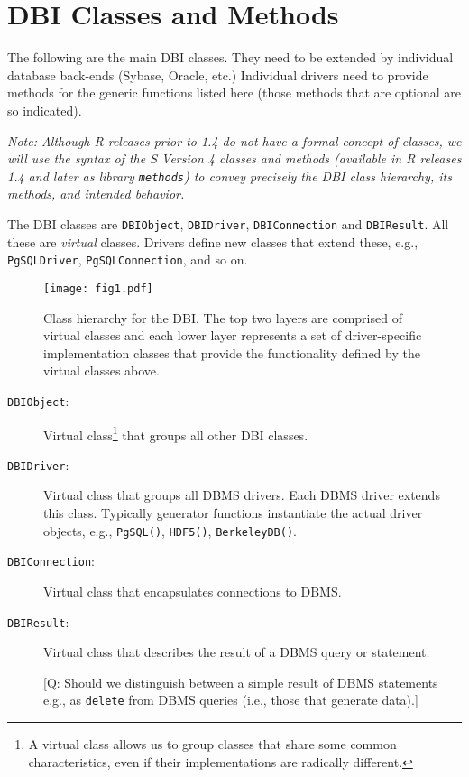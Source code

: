 \documentclass{article}
\newcommand{\sfun}[1]{\mbox{\tt #1()}}  %
\newcommand{\sobj}[1]{\mbox{\tt #1}}    %
\newcommand{\sclass}[1]{\mbox{\tt #1}}  %
\begin{document}
\section{DBI Classes and Methods}\label{sec:DBIClasses}
The following are the main DBI classes. They need to be extended
by individual database back-ends (Sybase, Oracle, etc.)  Individual
drivers need to provide methods for the generic functions listed here
(those methods that are optional are so indicated).

\emph{Note: Although R releases prior to 1.4 do not have a formal
concept of classes, we will use the syntax of the S Version
4 classes and methods (available in R releases 1.4 and later as
library \sobj{methods}) to convey precisely the DBI class hierarchy,
its methods, and intended behavior.  
}

The DBI classes are \sclass{DBIObject}, \sclass{DBIDriver},
\sclass{DBIConnection} and \sclass{DBIResult}. All these are
\emph{virtual} classes.  Drivers define new classes that extend
these, e.g., \sclass{PgSQLDriver}, \sclass{PgSQLConnection}, and
so on.
\begin{figure}
\texttt{[image: fig1.pdf]}
\caption{Class hierarchy for the DBI. The top two layers
are comprised of virtual classes and each lower layer represents
a set of driver-specific implementation classes that provide
the functionality defined by the virtual classes above.}
\end{figure}
\begin{description}
\item[\sclass{DBIObject}:]
  Virtual class\footnote{A virtual class allows us to group
  classes that share some common characteristics, even if their
  implementations are radically different.} that groups all other
  DBI classes.

\item[\sclass{DBIDriver}:]
  Virtual class that groups all DBMS drivers. Each DBMS driver
  extends this class.  Typically generator functions instantiate
  the actual driver objects, e.g., \sfun{PgSQL}, \sfun{HDF5}, 
  \sfun{BerkeleyDB}.

\item[\sclass{DBIConnection}:]
  Virtual class that encapsulates connections to DBMS.

\item[\sclass{DBIResult}:]
  Virtual class that describes the result of a DBMS query or statement.  

  [Q: Should we distinguish between a simple result of DBMS statements 
  e.g., as \texttt{delete} from DBMS queries (i.e., those that generate 
  data).]

\end{description} 
\end{document}
